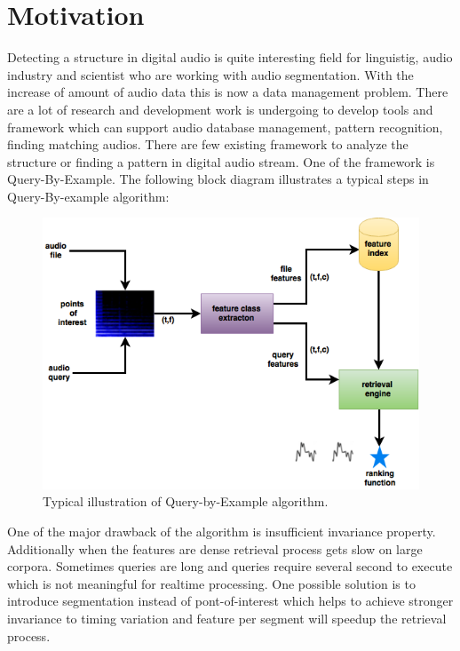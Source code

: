 \section{Motivation}


Detecting a structure in digital audio is quite interesting field for linguistig, audio industry and scientist who are working with audio segmentation. With the increase of amount of audio data this is now a data management problem. There are a lot of research and development work is undergoing to develop tools and framework which can support audio database management, pattern recognition, finding matching audios. There are few existing framework to analyze the structure or finding a pattern in digital audio stream. One of the framework is Query-By-Example. The following block diagram illustrates a typical steps in Query-By-example algorithm:
\begin{figure}[h]
\centering
\includegraphics[scale=0.5]{Figures/qbe.png}
\decoRule
\caption[hypercube]{Typical illustration of Query-by-Example algorithm.}
\label{fig:qbe}
\end{figure}


One of the major drawback of the algorithm is insufficient invariance property. Additionally when the features are dense retrieval process gets slow on large corpora. Sometimes queries are long and queries require several second to execute which is not meaningful for realtime processing. One possible solution is to introduce segmentation instead of pont-of-interest which helps to achieve stronger invariance to timing variation and feature per segment will speedup the retrieval process. 

